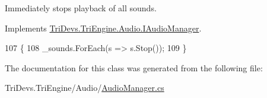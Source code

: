 Immediately stops playback of all sounds. 



Implements \hyperlink{interface_tri_devs_1_1_tri_engine_1_1_audio_1_1_i_audio_manager_a77c15b0eab9638436d5f7773c6fad61a}{Tri\-Devs.\-Tri\-Engine.\-Audio.\-I\-Audio\-Manager}.


\begin{DoxyCode}
107         \{
108             \_sounds.ForEach(s => s.Stop());
109         \}
\end{DoxyCode}


The documentation for this class was generated from the following file\-:\begin{DoxyCompactItemize}
\item 
Tri\-Devs.\-Tri\-Engine/\-Audio/\hyperlink{_audio_manager_8cs}{Audio\-Manager.\-cs}\end{DoxyCompactItemize}
